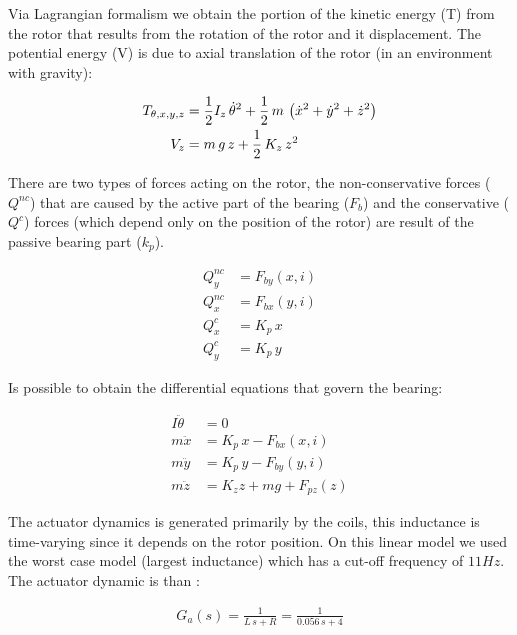\documentclass[10pt,fleqn,a4paper,twoside]{article}
\begin{document}
	Via Lagrangian formalism we obtain the portion of the kinetic energy (T) from the rotor that results from the rotation of the rotor and it displacement. The potential energy (V) is due to axial translation of the rotor (in an environment with gravity): 
	
	\begin{align}
		T_{\theta, x, y, z} &= \frac{1}{2} I_z \, \dot{\theta}^2 + \frac{1}{2} \, m \, \left( \dot{x}^2 + \dot{y}^2 + \dot{z}^2 \right) \notag \\
		V_z &= m \, g \, z + \frac{1}{2} \, K_z \, z^2
	\end{align}
	
	There are two types of forces acting on the rotor, the  non-conservative forces ($Q^{nc}$) that are caused by the active part of the bearing ($F_b$) and the conservative ($Q^{c}$) forces (which depend only on the position of the rotor) are result of the passive bearing part ($k_p$). 
	
	\begin{align}
		Q_y^{nc} &= F_{by}(x,i)  \\
		Q_x^{nc} &= F_{bx}(y,i)  \\
		Q^{c}_x &= K_p \, x \\
		Q^{c}_y &= K_p \, y 
	\end{align}
	
	Is possible to obtain the differential equations that govern the bearing:
		
	\begin{align}
		I \ddot{\theta} &= 0 \\
		m \ddot{x}		&= K_p \, x  - F_{bx}(x,i) \\
		m \ddot{y}		&= K_p \, y  - F_{by}(y,i)\\	
		m \ddot{z}  	&= K_z z + m g  + F_{pz}(z)
	\end{align}
	
	
	The actuator dynamics is generated primarily by the coils,  this inductance is time-varying since it depends on the rotor position. On this linear model we used the worst case model (largest inductance) which has a cut-off frequency of $11Hz$. The actuator dynamic is than :
	
	\begin{align}
		G_a(s) = \frac{1}{L \, s + R} =  \frac{1}{0.056 \, s + 4}
	\end{align}
	
\end{document}
